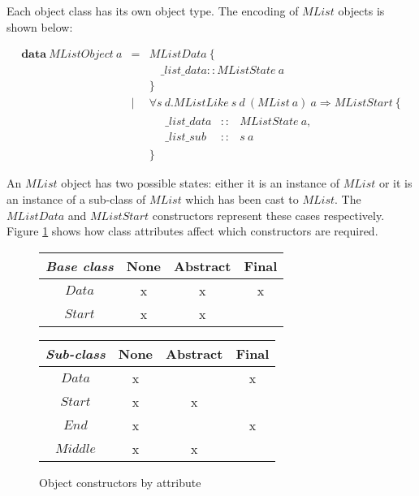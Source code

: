 \documentclass[runningheads,a4paper]{llncs}
\begin{document}
Each object class has its own object type. The encoding of $\mathit{MList}$ objects is shown below: 

\begin{displaymath}
\begin{array}{lcl}
\mathbf{data}~\mathit{MListObject}~a & = & \mathit{MListData}~\{ \\ 
 & & \quad \_\mathit{list}\_\mathit{data} :: \mathit{MListState}~a\\
 & & \} \\
 & \mid & \forall s~d.\mathit{MListLike}~s~d~(\mathit{MList}~a)~a \Rightarrow \mathit{MListStart}~\{\\
 & & \quad \begin{array}{lcl}
 \_\mathit{list}\_\mathit{data} & :: & \mathit{MListState}~a, \\
 \_\mathit{list}\_\mathit{sub}  & :: & s~a
 \end{array}\\
 & & \}
\end{array}
\end{displaymath}

An $\mathit{MList}$ object has two possible states: either it is an instance of $\mathit{MList}$ or it is an instance of a sub-class of $\mathit{MList}$ which has been cast to $\mathit{MList}$. The $\mathit{MListData}$ and $\mathit{MListStart}$ constructors represent these cases respectively. Figure \ref{tab:baseconstructors} shows how class attributes affect which constructors are required.

\begin{figure}
\begin{center}
\begin{tabular}{|c|c|c|c|}
\hline \emph{Base class} & None & Abstract & Final \\ 
\hline $\mathit{Data}$         & x & x & x \\ 
\hline $\mathit{Start}$     & x & x & \\
\hline
\end{tabular} 
\begin{tabular}{|c|c|c|c|}
\hline \emph{Sub-class} & None & Abstract & Final \\ 
\hline $\mathit{Data}$         & x &   & x \\ 
\hline $\mathit{Start}$     & x & x &   \\ 
\hline $\mathit{End}$     & x &   & x \\ 
\hline $\mathit{Middle}$ & x & x &   \\ 
\hline 
\end{tabular} 
\end{center}
\caption{Object constructors by attribute}
\label{tab:baseconstructors}
\end{figure}
\end{document}

